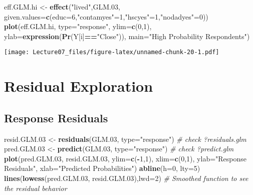 \documentclass[
]{article}
\newenvironment{Shaded}{\begin{snugshade}}{\end{snugshade}}
\newcommand{\CommentTok}[1]{\textcolor[rgb]{0.56,0.35,0.01}{\textit{#1}}}
\newcommand{\DataTypeTok}[1]{\textcolor[rgb]{0.13,0.29,0.53}{#1}}
\newcommand{\DecValTok}[1]{\textcolor[rgb]{0.00,0.00,0.81}{#1}}
\newcommand{\FloatTok}[1]{\textcolor[rgb]{0.00,0.00,0.81}{#1}}
\newcommand{\KeywordTok}[1]{\textcolor[rgb]{0.13,0.29,0.53}{\textbf{#1}}}
\newcommand{\NormalTok}[1]{#1}
\newcommand{\OperatorTok}[1]{\textcolor[rgb]{0.81,0.36,0.00}{\textbf{#1}}}
\newcommand{\StringTok}[1]{\textcolor[rgb]{0.31,0.60,0.02}{#1}}
\begin{document}
\begin{Shaded}
\begin{Highlighting}[]
\NormalTok{eff.GLM.hi <-}\StringTok{ }\KeywordTok{effect}\NormalTok{(}\StringTok{"lived"}\NormalTok{,GLM}\FloatTok{.03}\NormalTok{,}
                     \DataTypeTok{given.values=}\KeywordTok{c}\NormalTok{(}\DataTypeTok{educ=}\DecValTok{6}\NormalTok{,}\StringTok{"contamyes"}\NormalTok{=}\DecValTok{1}\NormalTok{,}\StringTok{"hscyes"}\NormalTok{=}\DecValTok{1}\NormalTok{,}\StringTok{"nodadyes"}\NormalTok{=}\DecValTok{0}\NormalTok{))}
\KeywordTok{plot}\NormalTok{(eff.GLM.hi, }\DataTypeTok{type=}\StringTok{"response"}\NormalTok{, }\DataTypeTok{ylim=}\KeywordTok{c}\NormalTok{(}\DecValTok{0}\NormalTok{,}\DecValTok{1}\NormalTok{), }\DataTypeTok{ylab=}\KeywordTok{expression}\NormalTok{(}\KeywordTok{Pr}\NormalTok{(Y[i]}\OperatorTok{==}\StringTok{"Close"}\NormalTok{)), }
     \DataTypeTok{main=}\StringTok{"High Probability Respondents"}\NormalTok{)}
\end{Highlighting}
\end{Shaded}

\texttt{[image: Lecture07\_files/figure-latex/unnamed-chunk-20-1.pdf]}

\hypertarget{residual-exploration}{%
\section{Residual Exploration}\label{residual-exploration}}

\hypertarget{response-residuals}{%
\subsection{Response Residuals}\label{response-residuals}}

\begin{Shaded}
\begin{Highlighting}[]
\NormalTok{resid.GLM}\FloatTok{.03}\NormalTok{ <-}\StringTok{ }\KeywordTok{residuals}\NormalTok{(GLM}\FloatTok{.03}\NormalTok{, }\DataTypeTok{type=}\StringTok{"response"}\NormalTok{)   }\CommentTok{# check ?residuals.glm}
\NormalTok{pred.GLM}\FloatTok{.03}\NormalTok{ <-}\StringTok{ }\KeywordTok{predict}\NormalTok{(GLM}\FloatTok{.03}\NormalTok{, }\DataTypeTok{type=}\StringTok{"response"}\NormalTok{)      }\CommentTok{# check ?predict.glm}
\KeywordTok{plot}\NormalTok{(pred.GLM}\FloatTok{.03}\NormalTok{, resid.GLM}\FloatTok{.03}\NormalTok{, }\DataTypeTok{ylim=}\KeywordTok{c}\NormalTok{(}\OperatorTok{-}\DecValTok{1}\NormalTok{,}\DecValTok{1}\NormalTok{), }\DataTypeTok{xlim=}\KeywordTok{c}\NormalTok{(}\DecValTok{0}\NormalTok{,}\DecValTok{1}\NormalTok{), }
     \DataTypeTok{ylab=}\StringTok{"Response Residuals"}\NormalTok{, }\DataTypeTok{xlab=}\StringTok{"Predicted Probabilities"}\NormalTok{)}
\KeywordTok{abline}\NormalTok{(}\DataTypeTok{h=}\DecValTok{0}\NormalTok{, }\DataTypeTok{lty=}\DecValTok{5}\NormalTok{)}
\KeywordTok{lines}\NormalTok{(}\KeywordTok{lowess}\NormalTok{(pred.GLM}\FloatTok{.03}\NormalTok{, resid.GLM}\FloatTok{.03}\NormalTok{),}\DataTypeTok{lwd=}\DecValTok{2}\NormalTok{)  }\CommentTok{# Smoothed function to see the residual behavior}
\end{Highlighting}
\end{Shaded}
\end{document}

